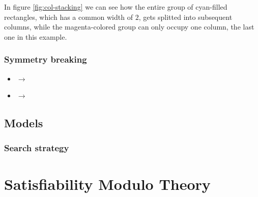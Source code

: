 \documentclass[a4paper,10pt]{article}
\newcommand{\xmark}{\ding{55}}%
\newcounter{subsubsubsection}[subsubsection]
\begin{document}
In figure \ref{fig:col-stacking} we can see how the entire group of cyan-filled rectangles, which has a common width of $2$, gets splitted into subsequent columns, while the magenta-colored group can only occupy one column, the last one in this example.

\subsubsection{Symmetry breaking}
\begin{itemize}
   \item {} $\rightarrow$ 
   \item {} $\rightarrow$ \xmark
\end{itemize}

 \label{sec:biggest-lower-left}
 \label{sec:areas-ordering}
 \label{sec:width-ordering}


\subsection{Models}

\subsubsection*{Search strategy}

\section{Satisfiability Modulo Theory}

\printbibliography
\end{document}
